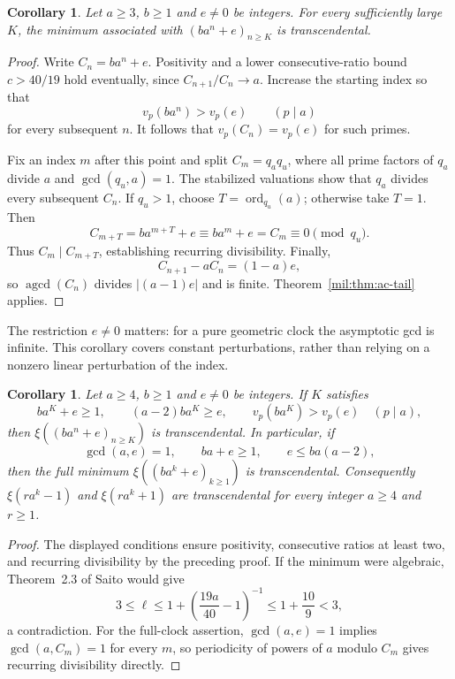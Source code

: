 \documentclass[11pt,a4paper]{article}
\newtheorem{corollary}[theorem]{Corollary}
\theoremstyle{definition}
\theoremstyle{remark}
\numberwithin{equation}{section}
\begin{document}
\begin{corollary}\label{mil:cor:ac-shifted}
Let $a\ge3$, $b\ge1$ and $e\ne0$ be integers. For every sufficiently
large $K$, the minimum associated with
$(ba^n+e)_{n\ge K}$ is transcendental.
\end{corollary}
\begin{proof}
Write $C_n=ba^n+e$. Positivity and a lower consecutive-ratio bound
$c>40/19$ hold eventually, since $C_{n+1}/C_n\to a$.
Increase the starting index so that
\[
 v_p(ba^n)>v_p(e)\qquad(p\mid a)
\]
for every subsequent $n$. It follows that $v_p(C_n)=v_p(e)$
for such primes.

Fix an index $m$ after this point and split $C_m=q_aq_u$, where
all prime factors of $q_a$ divide $a$ and $\gcd(q_u,a)=1$.
The stabilized valuations show that $q_a$ divides every subsequent
$C_n$. If $q_u>1$, choose $T=\operatorname{ord}_{q_u}(a)$;
otherwise take $T=1$. Then
\[
 C_{m+T}=ba^{m+T}+e\equiv ba^m+e=C_m\equiv0\pmod{q_u}.
\]
Thus $C_m\mid C_{m+T}$, establishing recurring divisibility.
Finally,
\[
 C_{n+1}-aC_n=(1-a)e,
\]
so $\operatorname{agcd}(C_n)$ divides $|(a-1)e|$ and is finite.
Theorem~\ref{mil:thm:ac-tail} applies.
\end{proof}

The restriction $e\ne0$ matters: for a pure geometric clock the
asymptotic gcd is infinite. This corollary covers constant
perturbations, rather than relying on a nonzero linear perturbation
of the index.

\begin{corollary}\label{mil:cor:ac-large-base}
Let $a\ge4$, $b\ge1$ and $e\ne0$ be integers. If $K$ satisfies
\[
 ba^K+e\ge1,\qquad (a-2)ba^K\ge e,\qquad
 v_p(ba^K)>v_p(e)\quad(p\mid a),
\]
then $\xi((ba^n+e)_{n\ge K})$ is transcendental.
In particular, if
\[
 \gcd(a,e)=1,\qquad ba+e\ge1,\qquad e\le ba(a-2),
\]
then the full minimum $\xi((ba^k+e)_{k\ge1})$ is transcendental.
Consequently $\xi(ra^k-1)$ and $\xi(ra^k+1)$ are transcendental
for every integer $a\ge4$ and $r\ge1$.
\end{corollary}
\begin{proof}
The displayed conditions ensure positivity, consecutive ratios
at least two, and recurring divisibility by the preceding proof.
If the minimum were algebraic, Theorem~2.3 of Saito would give
\[
 3\le\ell\le1+\left(\frac{19a}{40}-1\right)^{-1}
 \le1+\frac{10}{9}<3,
\]
a contradiction. For the full-clock assertion, $\gcd(a,e)=1$
implies $\gcd(a,C_m)=1$ for every $m$, so periodicity of powers
of $a$ modulo $C_m$ gives recurring divisibility directly.
\end{proof}
\end{document}
